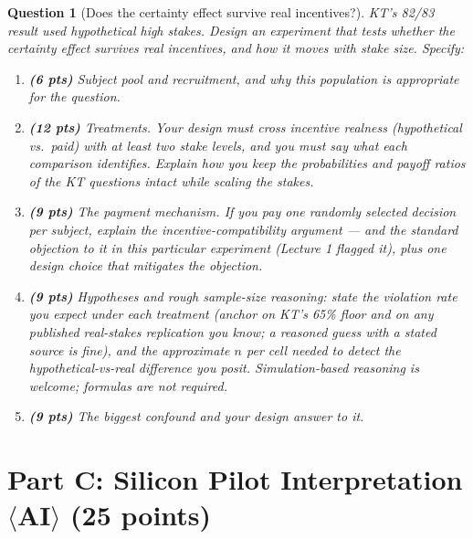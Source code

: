 \documentclass[11pt]{article}
\newtheorem{question}{Question}
\begin{document}
\begin{question}[Does the certainty effect survive real incentives?]
KT's 82/83 result used hypothetical high stakes. Design an experiment that
tests whether the certainty effect survives \emph{real} incentives, and how
it moves with stake size. Specify:
\begin{enumerate}[label=(\alph*)]
  \item \textbf{(6 pts)} Subject pool and recruitment, and why this
        population is appropriate for the question.
  \item \textbf{(12 pts)} Treatments. Your design must cross incentive
        realness (hypothetical vs.\ paid) with at least two stake levels,
        and you must say what each comparison identifies. Explain how you
        keep the \emph{probabilities and payoff ratios} of the KT questions
        intact while scaling the stakes.
  \item \textbf{(9 pts)} The payment mechanism. If you pay one randomly
        selected decision \emph{per subject}, explain the
        incentive-compatibility argument
        --- and the standard objection to it in \emph{this particular}
        experiment (Lecture 1 flagged it), plus one design choice that
        mitigates the objection.
  \item \textbf{(9 pts)} Hypotheses and rough sample-size reasoning: state
        the violation rate you expect under each treatment (anchor on KT's
        65\% floor and on any published real-stakes replication you know;
        a reasoned guess with a stated source is fine), and the approximate
        $n$ per cell needed to detect the hypothetical-vs-real difference
        you posit. Simulation-based reasoning is welcome; formulas are not
        required.
  \item \textbf{(9 pts)} The biggest confound and your design answer to it.
\end{enumerate}
\end{question}

\section*{Part C: Silicon Pilot Interpretation $\langle$AI$\rangle$
(25 points)}
\end{document}
